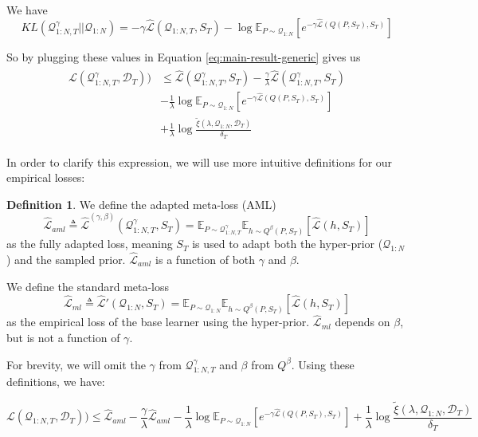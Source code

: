 \documentclass{article}
\theoremstyle{definition}
\newtheorem{defn}{Definition}[section]
\newcommand{\Expect}[2]{\mathbb{E}_{#1}\left [#2 \right ]}
\begin{document}
We have 
$$KL(\mathcal{Q}^{\gamma}_{1:N,T}||\mathcal{Q}_{1:N})=
-\gamma\hat{\mathcal{L}}(\mathcal{Q}_{1:N,T}, S_T)-\log\Expect{P\sim \mathcal{Q}_{1:N}}{e^{-\gamma\hat{\mathcal{L}}(Q(P,S_T),S_T)}}$$ 

So by plugging these values in Equation \ref{eq:main-result-generic} gives us
\begin{align*} 
\begin{split}
\mathcal{L}(\mathcal{Q}^{\gamma}_{1:N,T}, \mathcal{D}_T)) & \leq \hat{\mathcal{L}}(\mathcal{Q}^{\gamma}_{1:N,T}, S_T) -\frac{\gamma}{\lambda}\hat{\mathcal{L}}(\mathcal{Q}^{\gamma}_{1:N,T}, S_T) \\ &- \frac{1}{\lambda}\log\Expect{P\sim \mathcal{Q}_{1:N}}{e^{-\gamma\hat{\mathcal{L}}(Q(P,S_T),S_T)}}\\ &+\frac{1}{\lambda}\log\frac{\tilde{\xi}(\lambda,\mathcal{Q}_{1:N},\mathcal{D}_T)}{\delta_T}
\end{split}
\end{align*}

In order to clarify this expression, we will use more intuitive definitions for our empirical losses:
\begin{defn}
	We define the adapted meta-loss (AML) $$\hat{\mathcal{L}}_{aml}\triangleq \hat{\mathcal{L}}^{(\gamma,\beta)}(\mathcal{Q}^{\gamma}_{1:N,T}, S_T)=\mathbb{E}_{P\sim \mathcal{Q}^{\gamma}_{1:N,T}}\mathbb{E}_{h\sim Q^{\beta}(P,S_T)}\left [\hat{\mathcal{L}}(h, S_T)\right ]$$ as the fully adapted loss, meaning $S_T$ is used to adapt both the hyper-prior ($\mathcal{Q}_{1:N}$) and the sampled prior. $\hat{\mathcal{L}}_{aml}$ is a function of both $\gamma$ and $\beta$. 
	
	We define the standard meta-loss $$\hat{\mathcal{L}}_{ml}\triangleq \hat{\mathcal{L}}'(\mathcal{Q}_{1:N}, S_T)=\mathbb{E}_{P\sim \mathcal{Q}_{1:N}}\mathbb{E}_{h\sim Q^{\beta}(P,S_T)}\left [\hat{\mathcal{L}}(h, S_T)\right ]$$ as the empirical loss of the base learner using the hyper-prior. $\hat{\mathcal{L}}_{ml}$ depends on $\beta$, but is not a function of $\gamma$.
\end{defn}

For brevity, we will omit the $\gamma$ from $\mathcal{Q}^{\gamma}_{1:N,T}$ and $\beta$ from $Q^{\beta}$. Using these definitions, we have:

$$\mathcal{L}(\mathcal{Q}_{1:N,T}, \mathcal{D}_T)) \leq \hat{\mathcal{L}}_{aml} -\frac{\gamma}{\lambda}\hat{\mathcal{L}}_{aml} - \frac{1}{\lambda}\log \mathbb{E}_{P\sim \mathcal{Q}_{1:N}}\left [e^{-\gamma\hat{\mathcal{L}}(Q(P,S_T),S_T)}\right ]+\frac{1}{\lambda}\log\frac{\tilde{\xi}(\lambda,\mathcal{Q}_{1:N},\mathcal{D}_T)}{\delta_T}$$
\end{document}
